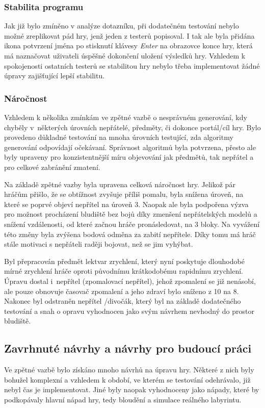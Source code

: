 \subsubsection*{\textbullet Stabilita programu}
Jak již bylo zmíněno v analýze dotazníku, při dodatečném testování nebylo možné zreplikovat pád hry, jenž jeden z testerů popisoval. I tak ale byla přidána ikona potvrzení jména po stisknutí klávesy \textit{Enter} na obrazovce konce hry, která má naznačovat uživateli úspěšné dokončení uložení výsledků hry. Vzhledem k spokojenosti ostatních testerů se stabilitou hry nebylo třeba implementovat žádné úpravy zajišťující lepší stabilitu.

\subsubsection*{\textbullet Náročnost}
Vzhledem k několika zmínkám ve zpětné vazbě o nesprávném generování, kdy chyběly v~některých úrovních nepřátelé, předměty, či dokonce portál/cíl hry. Bylo provedeno důkladné testování na mnoha úrovních testující, zda algoritmy generování odpovídají očekávaní. Správnost algoritmů byla potvrzena, přesto ale byly upraveny pro konzistentnější míru objevování jak předmětů, tak nepřátel a pro celkové zabránění zmatení.

Na základě zpětné vazby byla upravena celková náročnost hry. Jelikož pár hráčům přišlo, že se obtížnost zvyšuje příliš pomalu, byla snížena úroveň, na které se poprvé objeví nepřítel na úroveň 3. Naopak ale byla podpořena výzva pro možnost procházení bludiště bez bojů díky zmenšení nepřátelských modelů a snížení vzdálenosti, od které začnou hráče pronásledovat, na 3 bloky. Na vyvážení této změny byla zvýšena bodová odměna za zabití nepřítele. Díky tomu má hráč stále motivaci s nepřáteli raději bojovat, než se jim vyhýbat.

Byl přepracován předmět lektvar zrychlení, který nyní poskytuje dlouhodobé mírné zrychlení hráče oproti původnímu krátkodobému rapidnímu zrychlení. Úpravu dostal i~nepřítel  (zpomalovací nepřítel), jehož zpomalení se již nenásobí, ale pouze obnovuje časovač zpomalení a jeho zdraví bylo sníženo z 10 na 8. Nakonec byl odstraněn nepřítel /divočák, který byl na základě dodatečného testování a snah o opravu vyhodnocen jako svým návrhem nevhodný do prostor bludiště.

\subsection*{Zavrhnuté návrhy a návrhy pro budoucí práci}
Ve zpětné vazbě bylo získáno mnoho návrhů na úpravu hry. Některé z nich byly bohužel komplexní a vzhledem k období, ve kterém se testování odehrávalo, již nebyl čas je implementovat. Jiné byly naopak vyhodnoceny jako nápady, které by podkopávaly hlavní nápad hry, tedy bloudění a simulace reálného labyrintu.

